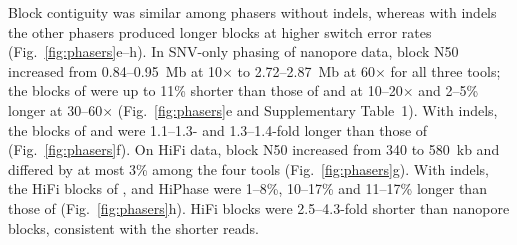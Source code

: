 Block contiguity was similar among phasers without indels, whereas with indels the other phasers produced longer blocks at higher switch error rates (Fig.~\ref{fig:phasers}e--h). In SNV-only phasing of nanopore data, block N50 increased from 0.84--0.95~Mb at 10$\times$ to 2.72--2.87~Mb at 60$\times$ for all three tools; the blocks of \toolname were up to 11\% shorter than those of \whatshap and \hapcut at 10--20$\times$ and 2--5\% longer at 30--60$\times$ (Fig.~\ref{fig:phasers}e and Supplementary Table~1). With indels, the blocks of \whatshap and \hapcut were 1.1--1.3- and 1.3--1.4-fold longer than those of \toolname (Fig.~\ref{fig:phasers}f). On HiFi data, block N50 increased from 340 to 580~kb and differed by at most 3\% among the four tools (Fig.~\ref{fig:phasers}g). With indels, the HiFi blocks of \whatshap, \hapcut and HiPhase were 1--8\%, 10--17\% and 11--17\% longer than those of \toolname (Fig.~\ref{fig:phasers}h). HiFi blocks were 2.5--4.3-fold shorter than nanopore blocks, consistent with the shorter reads.


